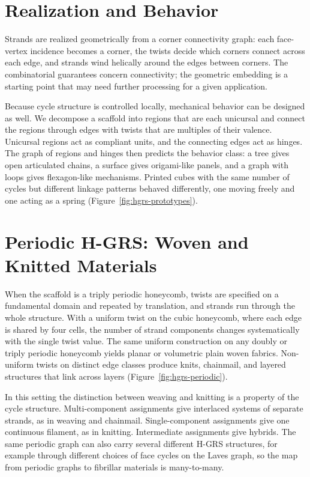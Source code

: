 \section{Realization and Behavior}
\label{sec:hgrs-behavior}

Strands are realized geometrically from a corner connectivity graph: each face-vertex incidence becomes a corner, the twists decide which corners connect across each edge, and strands wind helically around the edges between corners. The combinatorial guarantees concern connectivity; the geometric embedding is a starting point that may need further processing for a given application.

Because cycle structure is controlled locally, mechanical behavior can be designed as well. We decompose a scaffold into regions that are each unicursal and connect the regions through edges with twists that are multiples of their valence. Unicursal regions act as compliant units, and the connecting edges act as hinges. The graph of regions and hinges then predicts the behavior class: a tree gives open articulated chains, a surface gives origami-like panels, and a graph with loops gives flexagon-like mechanisms. Printed cubes with the same number of cycles but different linkage patterns behaved differently, one moving freely and one acting as a spring (Figure~\ref{fig:hgrs-prototypes}).

\section{Periodic H-GRS: Woven and Knitted Materials}
\label{sec:hgrs-periodic}

When the scaffold is a triply periodic honeycomb, twists are specified on a fundamental domain and repeated by translation, and strands run through the whole structure. With a uniform twist on the cubic honeycomb, where each edge is shared by four cells, the number of strand components changes systematically with the single twist value. The same uniform construction on any doubly or triply periodic honeycomb yields planar or volumetric plain woven fabrics. Non-uniform twists on distinct edge classes produce knits, chainmail, and layered structures that link across layers (Figure~\ref{fig:hgrs-periodic}).

In this setting the distinction between weaving and knitting is a property of the cycle structure. Multi-component assignments give interlaced systems of separate strands, as in weaving and chainmail. Single-component assignments give one continuous filament, as in knitting. Intermediate assignments give hybrids. The same periodic graph can also carry several different H-GRS structures, for example through different choices of face cycles on the Laves graph, so the map from periodic graphs to fibrillar materials is many-to-many.


